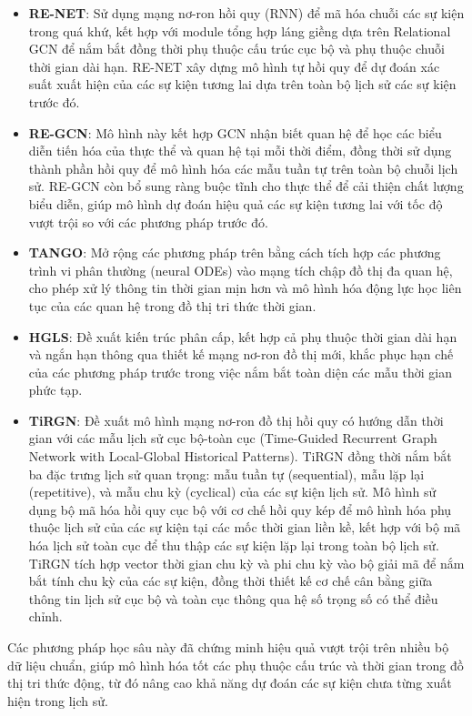 \begin{itemize}
    \item \textbf{RE-NET}: Sử dụng mạng nơ-ron hồi quy (RNN) để mã hóa chuỗi các sự kiện trong quá khứ, kết hợp với module tổng hợp láng giềng dựa trên Relational GCN để nắm bắt đồng thời phụ thuộc cấu trúc cục bộ và phụ thuộc chuỗi thời gian dài hạn. RE-NET xây dựng mô hình tự hồi quy để dự đoán xác suất xuất hiện của các sự kiện tương lai dựa trên toàn bộ lịch sử các sự kiện trước đó.
    \item \textbf{RE-GCN}: Mô hình này kết hợp GCN nhận biết quan hệ để học các biểu diễn tiến hóa của thực thể và quan hệ tại mỗi thời điểm, đồng thời sử dụng thành phần hồi quy để mô hình hóa các mẫu tuần tự trên toàn bộ chuỗi lịch sử. RE-GCN còn bổ sung ràng buộc tĩnh cho thực thể để cải thiện chất lượng biểu diễn, giúp mô hình dự đoán hiệu quả các sự kiện tương lai với tốc độ vượt trội so với các phương pháp trước đó.
    \item \textbf{TANGO}: Mở rộng các phương pháp trên bằng cách tích hợp các phương trình vi phân thường (neural ODEs) vào mạng tích chập đồ thị đa quan hệ, cho phép xử lý thông tin thời gian mịn hơn và mô hình hóa động lực học liên tục của các quan hệ trong đồ thị tri thức thời gian.
    \item \textbf{HGLS}: Đề xuất kiến trúc phân cấp, kết hợp cả phụ thuộc thời gian dài hạn và ngắn hạn thông qua thiết kế mạng nơ-ron đồ thị mới, khắc phục hạn chế của các phương pháp trước trong việc nắm bắt toàn diện các mẫu thời gian phức tạp.
    \item \textbf{TiRGN}: Đề xuất mô hình mạng nơ-ron đồ thị hồi quy có hướng dẫn thời gian với các mẫu lịch sử cục bộ-toàn cục (Time-Guided Recurrent Graph Network with Local-Global Historical Patterns). TiRGN đồng thời nắm bắt ba đặc trưng lịch sử quan trọng: mẫu tuần tự (sequential), mẫu lặp lại (repetitive), và mẫu chu kỳ (cyclical) của các sự kiện lịch sử. Mô hình sử dụng bộ mã hóa hồi quy cục bộ với cơ chế hồi quy kép để mô hình hóa phụ thuộc lịch sử của các sự kiện tại các mốc thời gian liền kề, kết hợp với bộ mã hóa lịch sử toàn cục để thu thập các sự kiện lặp lại trong toàn bộ lịch sử. TiRGN tích hợp vector thời gian chu kỳ và phi chu kỳ vào bộ giải mã để nắm bắt tính chu kỳ của các sự kiện, đồng thời thiết kế cơ chế cân bằng giữa thông tin lịch sử cục bộ và toàn cục thông qua hệ số trọng số có thể điều chỉnh.
\end{itemize}

Các phương pháp học sâu này đã chứng minh hiệu quả vượt trội trên nhiều bộ dữ liệu chuẩn, giúp mô hình hóa tốt các phụ thuộc cấu trúc và thời gian trong đồ thị tri thức động, từ đó nâng cao khả năng dự đoán các sự kiện chưa từng xuất hiện trong lịch sử.

